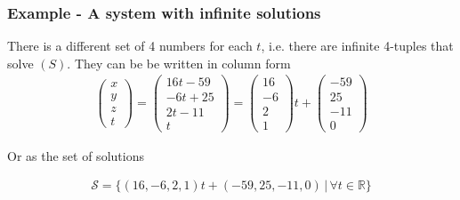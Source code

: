 \documentclass[usenames,dvipsnames,aspectratio=169,10pt]{beamer}
\numberwithin{equation}{section}
\begin{document}
\begin{frame}
\frametitle{Example - A system with infinite solutions}
There is a different set of 4 numbers for each $t$, i.e. there are infinite 4-tuples that solve  $(S)$. They can be be written in column form
\begin{align*}
\begin{pmatrix}
   x \\
   y \\
   z \\
   t
\end{pmatrix}
=
\begin{pmatrix}
   16t - 59 \\
   -6t + 25\\
    2t - 11\\
     t
\end{pmatrix}
=
\begin{pmatrix}
   16 \\
    -6 \\
   2\\
   1
\end{pmatrix}
t
+
\begin{pmatrix}
   -59 \\
    25 \\
   -11 \\
     0
\end{pmatrix}
\end{align*}

Or as the set of solutions

\begin{align*}
\mathcal{S} = \{ (16,-6,2,1)t + (-59,25,-11,0) \, | \, \forall	t\in\mathbb{R} \}
\end{align*}

\end{frame}
\end{document}
